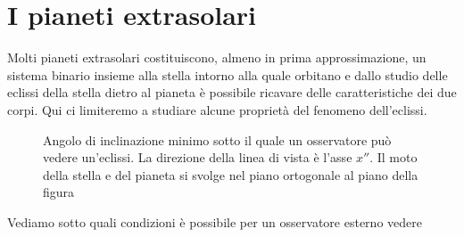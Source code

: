 \section{I pianeti extrasolari}
\label{sec:extrasolari}

Molti pianeti extrasolari costituiscono, almeno in prima approssimazione, un
sistema binario insieme alla stella intorno alla quale orbitano e dallo studio
delle eclissi della stella dietro al pianeta è possibile ricavare delle
caratteristiche dei due corpi. Qui ci limiteremo a studiare alcune proprietà del
fenomeno dell'eclissi.

\begin{figure}
  \centering
  \caption[Angolo di inclinazione minimo sotto il quale un osservatore può
  vedere
  un'eclissi]{Angolo di inclinazione minimo sotto il quale un osservatore può
    vedere un'eclissi. La direzione della linea di vista è l'asse $x''$. Il moto
    della stella e del pianeta si svolge nel piano ortogonale al piano della
    figura}
  \label{fig:minimo-angolo-eclissi}
\end{figure}
Vediamo sotto quali condizioni è possibile per un osservatore esterno vedere
